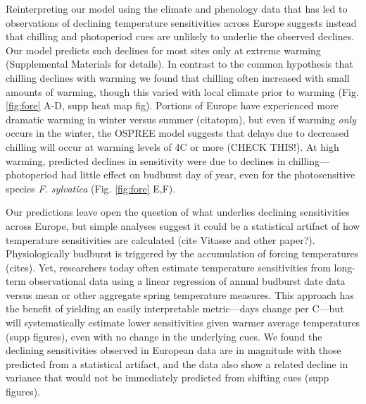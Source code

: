 \documentclass{article}
\begin{document}
\par Reinterpreting our model using the climate and phenology data that has led to observations of declining temperature sensitivities across Europe suggests instead that chilling and photoperiod cues are unlikely to underlie the observed declines. Our model predicts such declines for most sites only at extreme warming (Supplemental Materials for details). In contrast to the common hypothesis that chilling declines with warming we found that chilling often increased with small amounts of warming, though this varied with local climate prior to warming (Fig. \ref{fig:fore} A-D, supp heat map fig). Portions of Europe have experienced more dramatic warming in winter versus summer (citatopm), but even if warming \emph{only} occurs in the winter, the OSPREE model suggests that delays due to decreased chilling will occur at warming levels of 4\degree C or more (CHECK THIS!). At high warming, predicted declines in sensitivity were due to declines in chilling---photoperiod had little effect on budburst day of year, even for the photosensitive species \emph{F. sylvatica} (Fig. \ref{fig:fore} E,F).  %

\par Our predictions leave open the question of what underlies declining sensitivities across Europe, but simple analyses suggest it could be a statistical artifact of how temperature sensitivities are calculated (cite Vitasse and other paper?). Physiologically budburst is triggered by the accumulation of forcing temperatures (cites). Yet, researchers today often estimate temperature sensitivities from long-term observational data using a linear regression of annual budburst date data versus mean or other aggregate spring temperature measures. This approach has the benefit of yielding an easily interpretable metric---days change per \degree C---but will systematically estimate lower sensitivities given warmer average temperatures (supp figures), even with no change in the underlying cues. We found the declining  sensitivities observed in European data are in magnitude with those predicted from a statistical artifact, and the data also show a related decline in variance that would not be immediately predicted from shifting cues (supp figures). %
\end{document}
